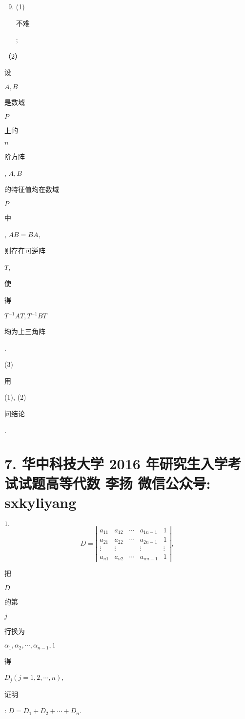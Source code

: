\documentclass[10pt]{article}
\begin{document}
\begin{enumerate}
  \setcounter{enumi}{8}
  \item (1) \begin{CJK}{UTF8}{mj}不难\end{CJK};
\end{enumerate}
（2） \begin{CJK}{UTF8}{mj}设\end{CJK} $A, B$ \begin{CJK}{UTF8}{mj}是数域\end{CJK} $P$ \begin{CJK}{UTF8}{mj}上的\end{CJK} $n$ \begin{CJK}{UTF8}{mj}阶方阵\end{CJK}, $A, B$ \begin{CJK}{UTF8}{mj}的特征值均在数域\end{CJK} $P$ \begin{CJK}{UTF8}{mj}中\end{CJK}, $A B=B A$, \begin{CJK}{UTF8}{mj}则存在可逆阵\end{CJK} $T$, \begin{CJK}{UTF8}{mj}使\end{CJK} \begin{CJK}{UTF8}{mj}得\end{CJK} $T^{-1} A T, T^{-1} B T$ \begin{CJK}{UTF8}{mj}均为上三角阵\end{CJK}.

(3)\begin{CJK}{UTF8}{mj}用\end{CJK} (1), (2) \begin{CJK}{UTF8}{mj}问结论\end{CJK}.

\section{7. 华中科技大学 2016 年研究生入学考试试题高等代数 
 李扬 
 微信公众号: sxkyliyang}
$1 .$
$$
D=\left|\begin{array}{ccccc}
a_{11} & a_{12} & \cdots & a_{1 n-1} & 1 \\
a_{21} & a_{22} & \cdots & a_{2 n-1} & 1 \\
\vdots & \vdots & & \vdots & \vdots \\
a_{n 1} & a_{n 2} & \cdots & a_{n n-1} & 1
\end{array}\right|,
$$
\begin{CJK}{UTF8}{mj}把\end{CJK} $D$ \begin{CJK}{UTF8}{mj}的第\end{CJK} $j$ \begin{CJK}{UTF8}{mj}行换为\end{CJK} $\alpha_{1}, \alpha_{2}, \cdots, \alpha_{n-1}, 1$ \begin{CJK}{UTF8}{mj}得\end{CJK} $D_{j}(j=1,2, \cdots, n)$, \begin{CJK}{UTF8}{mj}证明\end{CJK}: $D=D_{1}+D_{2}+\cdots+D_{n}$.
\end{document}
